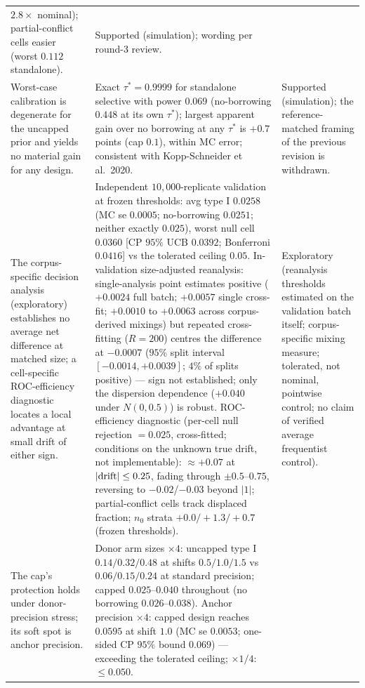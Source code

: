 \documentclass[11pt]{article}
\begin{document}
\begin{longtable}{p{} p{} p{}}
$2.8\times$ nominal); partial-conflict cells easier (worst $0.112$
standalone). & Supported (simulation); wording per round-3 review. \\
Worst-case calibration is degenerate for the uncapped prior and yields no
material gain for any design. & Exact $\tau^{*}=0.9999$ for standalone
selective with power $0.069$ (no-borrowing $0.448$ at its own $\tau^{*}$);
largest apparent gain over no borrowing at any $\tau^{*}$ is $+0.7$ points
(cap $0.1$), within MC error; consistent with Kopp-Schneider et al.\ 2020.
& Supported (simulation); the reference-matched framing of the previous
revision is withdrawn. \\
The corpus-specific decision analysis (exploratory) establishes no
average net difference at matched size; a cell-specific ROC-efficiency
diagnostic locates a local advantage at small drift of either sign. &
Independent $10{,}000$-replicate validation at frozen thresholds: avg type
I $0.0258$ (MC se $0.0005$; no-borrowing $0.0251$; neither exactly
$0.025$), worst null cell $0.0360$ [CP $95\%$ UCB $0.0392$; Bonferroni
$0.0416$] vs the tolerated ceiling $0.05$. In-validation size-adjusted
reanalysis: single-analysis point estimates positive ($+0.0024$ full
batch; $+0.0057$ single cross-fit; $+0.0010$ to $+0.0063$ across
corpus-derived mixings) but repeated cross-fitting ($R=200$) centres the
difference at $-0.0007$ ($95\%$ split interval $[-0.0014,+0.0039]$; $4\%$
of splits positive) --- sign not established; only the dispersion
dependence ($+0.040$ under $N(0,0.5)$) is robust. ROC-efficiency
diagnostic (per-cell null rejection $=0.025$, cross-fitted; conditions on
the unknown true drift, not implementable): $\approx +0.07$ at
$|{\rm drift}| \le 0.25$, fading through $\pm 0.5$--$0.75$, reversing to
$-0.02$/$-0.03$ beyond $|1|$; partial-conflict cells track displaced
fraction; $n_0$ strata $+0.0/+1.3/+0.7$ (frozen thresholds). &
Exploratory
(reanalysis thresholds estimated on the validation batch itself;
corpus-specific mixing measure; tolerated, not nominal, pointwise
control; no claim of verified average frequentist control). \\
The cap's protection holds under donor-precision stress; its soft spot is
anchor precision. & Donor arm sizes $\times 4$: uncapped type I
$0.14/0.32/0.48$ at shifts $0.5/1.0/1.5$ vs $0.06/0.15/0.24$ at standard
precision; capped $0.025$--$0.040$ throughout (no borrowing
$0.026$--$0.038$). Anchor precision $\times 4$: capped design reaches
$0.0595$ at shift $1.0$ (MC se $0.0053$; one-sided CP $95\%$ bound
$0.069$) --- exceeding the tolerated ceiling; $\times 1/4$: $\le 0.050$.

\end{longtable}
\end{document}
